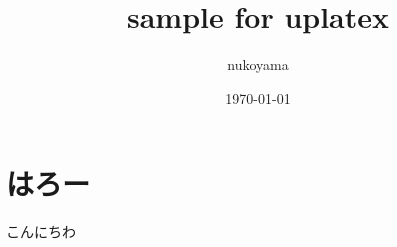 \documentclass{ltjsarticle} %
\title{sample for uplatex}
\author{nukoyama}
\date{\today}
\begin{document}
\maketitle

\section{はろー}
こんにちわ
\end{document}

